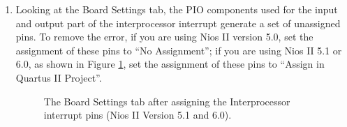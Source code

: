 \begin{enumerate}
\item Looking at the Board Settings tab, the PIO components used for
  the input and output part of the interprocessor interrupt generate a
  set of unassigned pins. To remove the error, if you are using Nios
  II version 5.0, set the assignment of these pins to ``No
  Assignment''; if you are using Nios II 5.1 or 6.0, as shown in
  Figure \ref{fig:tutorial_boardsettings_after}, set the assignment of
  these pins to ``Assign in Quartus II Project''.
%
%
%
\begin{figure}

\caption{\label{fig:tutorial_boardsettings_after}The Board Settings
tab after assigning the Interprocessor interrupt pins (Nios II Version 5.1 and 6.0).}
\end{figure}


\end{enumerate}
